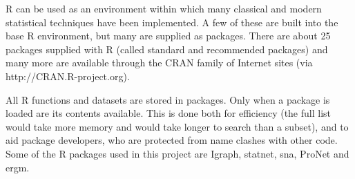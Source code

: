 R can be used as an environment within which many classical and modern statistical techniques have been implemented.
A few of these are built into the base R environment, but many are supplied as packages. There are about 25 packages
supplied with R (called standard and recommended packages) and many more are available through the CRAN family of
Internet sites (via http://CRAN.R-project.org).

All R functions and datasets are stored in packages. Only when a package is loaded are its contents available.
This is done both for efficiency (the full list would take more memory and would take longer to search than a subset),
and to aid package developers, who are protected from name clashes with other code.
Some of the R packages used in this project are Igraph, statnet, sna, ProNet and ergm.



